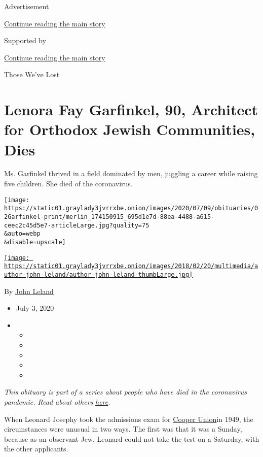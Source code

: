 Advertisement

\protect\hyperlink{after-top}{Continue reading the main story}

Supported by

\protect\hyperlink{after-sponsor}{Continue reading the main story}

Those We've Lost

\hypertarget{lenora-fay-garfinkel-90-architect-for-orthodox-jewish-communities-dies}{%
\section{Lenora Fay Garfinkel, 90, Architect for Orthodox Jewish
Communities,
Dies}\label{lenora-fay-garfinkel-90-architect-for-orthodox-jewish-communities-dies}}

Ms. Garfinkel thrived in a field dominated by men, juggling a career
while raising five children. She died of the coronavirus.

\texttt{[image: https://static01.graylady3jvrrxbe.onion/images/2020/07/09/obituaries/02Garfinkel-print/merlin\_174150915\_695d1e7d-88ea-4488-a615-ceec2c45d5e7-articleLarge.jpg?quality=75\\\&auto=webp\\\&disable=upscale]}

\href{https://www.nytimes3xbfgragh.onion/by/john-leland}{\texttt{[image: https://static01.graylady3jvrrxbe.onion/images/2018/02/20/multimedia/author-john-leland/author-john-leland-thumbLarge.jpg]}}

By \href{https://www.nytimes3xbfgragh.onion/by/john-leland}{John Leland}

\begin{itemize}
\item
  July 3, 2020
\item
  \begin{itemize}
  \item
  \item
  \item
  \item
  \item
  \end{itemize}
\end{itemize}

\emph{This obituary is part of a series about people who have died in
the coronavirus pandemic. Read about others}
\href{https://www.nytimes3xbfgragh.onion/interactive/2020/obituaries/people-died-coronavirus-obituaries.html}{\emph{here}}\emph{.}

When Leonard Josephy took the admissions exam for
\href{http://cooper.edu/welcome}{Cooper Union}in 1949, the circumstances
were unusual in two ways. The first was that it was a Sunday, because as
an observant Jew, Leonard could not take the test on a Saturday, with
the other applicants.

